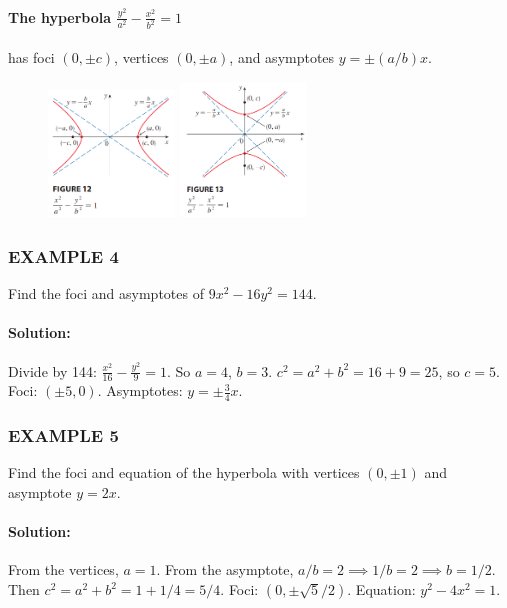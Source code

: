 \documentclass{article}
\begin{document}
\paragraph{The hyperbola $\frac{y^2}{a^2} - \frac{x^2}{b^2} = 1$} has foci $(0, \pm c)$, vertices $(0, \pm a)$, and asymptotes $y = \pm(a/b)x$.
\begin{figure}[htbp]
    \centering
    \includegraphics[width=0.3\textwidth]{graph57.png}
    \includegraphics[width=0.3\textwidth]{graph58.png}
\end{figure}
\subsubsection*{EXAMPLE 4}
Find the foci and asymptotes of $9x^2 - 16y^2 = 144$.

\paragraph{Solution:} Divide by 144: $\frac{x^2}{16} - \frac{y^2}{9} = 1$.
So $a=4$, $b=3$. $c^2 = a^2 + b^2 = 16+9=25$, so $c=5$.
Foci: $(\pm5, 0)$. Asymptotes: $y = \pm\frac{3}{4}x$.

\subsubsection*{EXAMPLE 5}
Find the foci and equation of the hyperbola with vertices $(0, \pm1)$ and asymptote $y = 2x$.

\paragraph{Solution:}
From the vertices, $a=1$. From the asymptote, $a/b = 2 \implies 1/b = 2 \implies b = 1/2$.
Then $c^2 = a^2 + b^2 = 1 + 1/4 = 5/4$.
Foci: $(0, \pm\sqrt{5}/2)$. Equation: $y^2 - 4x^2 = 1$.
\end{document}
